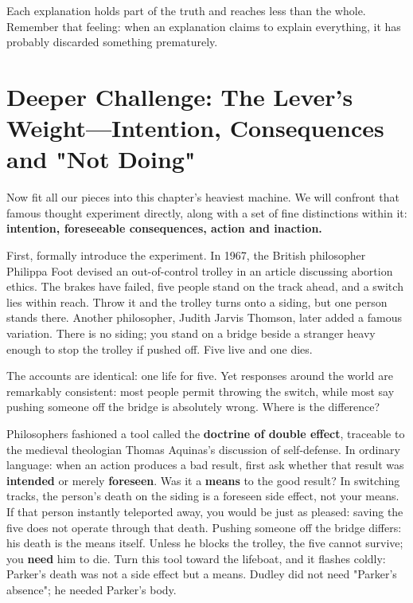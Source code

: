 Each explanation holds part of the truth and reaches less than the whole. Remember that feeling: when an explanation claims to explain everything, it has probably discarded something prematurely.

\section[Intention, Consequences and Inaction]{Deeper Challenge: The Lever's Weight---Intention, Consequences and "Not Doing"}
Now fit all our pieces into this chapter's heaviest machine. We will confront that famous thought experiment directly, along with a set of fine distinctions within it: \textbf{intention, foreseeable consequences, action and inaction.}

First, formally introduce the experiment. In 1967, the British philosopher Philippa Foot devised an out-of-control trolley in an article discussing abortion ethics. The brakes have failed, five people stand on the track ahead, and a switch lies within reach. Throw it and the trolley turns onto a siding, but one person stands there. Another philosopher, Judith Jarvis Thomson, later added a famous variation. There is no siding; you stand on a bridge beside a stranger heavy enough to stop the trolley if pushed off. Five live and one dies.

The accounts are identical: one life for five. Yet responses around the world are remarkably consistent: most people permit throwing the switch, while most say pushing someone off the bridge is absolutely wrong. Where is the difference?

Philosophers fashioned a tool called the \textbf{doctrine of double effect}, traceable to the medieval theologian Thomas Aquinas's discussion of self-defense. In ordinary language: when an action produces a bad result, first ask whether that result was \textbf{intended} or merely \textbf{foreseen}. Was it a \textbf{means} to the good result? In switching tracks, the person's death on the siding is a foreseen side effect, not your means. If that person instantly teleported away, you would be just as pleased: saving the five does not operate through that death. Pushing someone off the bridge differs: his death is the means itself. Unless he blocks the trolley, the five cannot survive; you \textbf{need} him to die. Turn this tool toward the lifeboat, and it flashes coldly: Parker's death was not a side effect but a means. Dudley did not need "Parker's absence"; he needed Parker's body.

